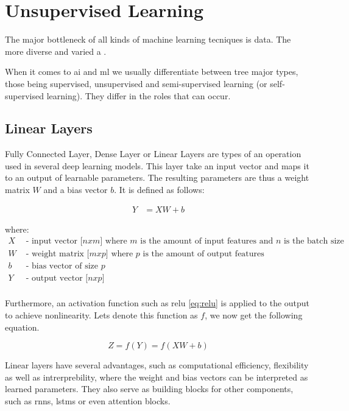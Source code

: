 \section{Unsupervised Learning}

The major bottleneck of all kinds of machine learning tecniques is data. The more diverse and varied a .

When it comes to \acrshort{ai} and \acrshort{ml} we usually differentiate between tree major types, those being supervised, unsupervised and semi-supervised learning (or self-supervised learning). They differ in the roles that can occur.


\subsection{Linear Layers}

Fully Connected Layer, Dense Layer or Linear Layers  are types of an operation used in several deep learning models. This layer take an input vector and maps it to an output of learnable parameters. The resulting parameters are thus a weight matrix $W$ and a bias vector $b$. It is defined as follows:

\begin{align}
    Y &= XW + b
\end{align}

where:
\begin{align*}
    X & \text{ - input vector [$n x m$] where $m$ is the amount of input features and $n$ is the batch size} \\
    W & \text{ - weight matrix [$m x p$] where $p$ is the amount of output features} \\
    b & \text{ - bias vector of size $p$} \\
    Y & \text{ - output vector [$n x p$]} \\
\end{align*}

Furthermore, an activation function such as \gls{relu} \ref{eq:relu} is applied to the output to achieve nonlinearity.
Lets denote this function as $f$, we now get the following equation.

\begin{equation}
    Z = f(Y) = f(XW+b)
\end{equation}

Linear layers have several advantages, such as computational efficiency, flexibility as well as intrerprebility, where the weight and bias vectors can be interpreted as learned parameters. They also serve as building blocks for other components, such as \acrshort{rnn}s, \acrshort{lstm}s or even attention blocks. \\ 

